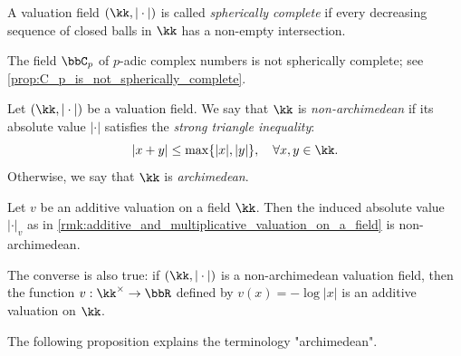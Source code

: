     \begin{definition}\label{def:spherically_complete}
        A valuation field \((\kk,|\cdot|)\) is called \emph{spherically complete} if every decreasing sequence of closed balls in \(\kk\) has a non-empty intersection.
    \end{definition}

    \begin{example}\label{eg:p-adic_complex_field_is_not_spherically_complete}
        The field \(\bbC_p\) of \(p\)-adic complex numbers is not spherically complete; see \cref{prop:C_p_is_not_spherically_complete}.
    \end{example}

    \begin{definition}\label{def:archimedean_and_non-archimedean_valuation}
        Let \((\kk,|\cdot|)\) be a valuation field.
        We say that \(\kk\) is \emph{non-archimedean} if its absolute value \(|\cdot|\) satisfies the \emph{strong triangle inequality}:
        \[ |x+y|\leq\max\{|x|,|y|\},\quad\forall x,y\in\kk. \]
        Otherwise, we say that \(\kk\) is \emph{archimedean}.
    \end{definition}

    \begin{example}\label{eg:archimedean_absolute_value_and_additive_valuation}
        Let \(v\) be an additive valuation on a field \(\kk\).
        Then the induced absolute value \(|\cdot|_v\) as in \cref{rmk:additive_and_multiplicative_valuation_on_a_field} is non-archimedean.

        The converse is also true: if \((\kk, |\cdot|)\) is a non-archimedean valuation field, 
        then the function \(v: \kk^\times \to \bbR\) defined by \(v(x) = -\log |x|\) is an additive valuation on \(\kk\).
    \end{example}

    The following proposition explains the terminology "archimedean".

